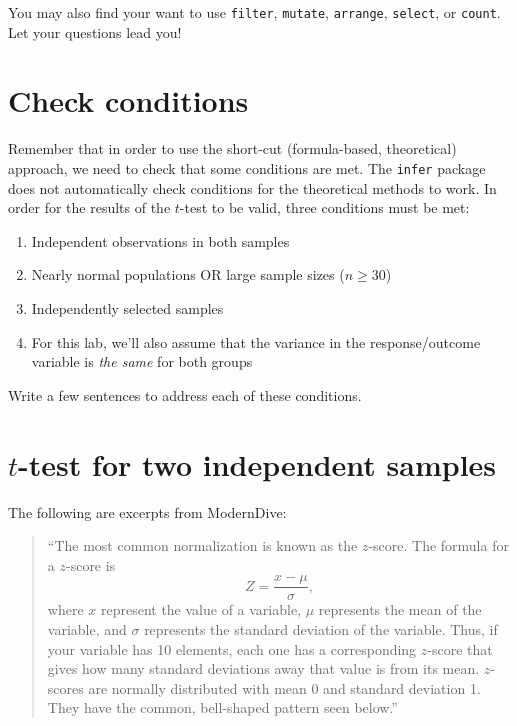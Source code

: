 \documentclass[]{article}
\providecommand{\tightlist}{%
  \setlength{\itemsep}{0pt}\setlength{\parskip}{0pt}}
\begin{document}
You may also find your want to use \texttt{filter}, \texttt{mutate},
\texttt{arrange}, \texttt{select}, or \texttt{count}. Let your questions
lead you!

\section{Check conditions}\label{check-conditions}

Remember that in order to use the short-cut (formula-based, theoretical)
approach, we need to check that some conditions are met. The
\texttt{infer} package does not automatically check conditions for the
theoretical methods to work. In order for the results of the \(t\)-test
to be valid, three conditions must be met:

\begin{enumerate}
\def\labelenumi{\arabic{enumi}.}
\tightlist
\item
  Independent observations in both samples
\item
  Nearly normal populations OR large sample sizes (\(n \ge 30\))
\item
  Independently selected samples
\item
  For this lab, we'll also assume that the variance in the
  response/outcome variable is \emph{the same} for both groups
\end{enumerate}

Write a few sentences to address each of these conditions.

\section{\texorpdfstring{\(t\)-test for two independent
samples}{t-test for two independent samples}}\label{t-test-for-two-independent-samples}

The following are excerpts from ModernDive:

\begin{quote}
``The most common normalization is known as the \(z\)-score. The formula
for a \(z\)-score is \[Z = \frac{x - \mu}{\sigma},\] where \(x\)
represent the value of a variable, \(\mu\) represents the mean of the
variable, and \(\sigma\) represents the standard deviation of the
variable. Thus, if your variable has 10 elements, each one has a
corresponding \(z\)-score that gives how many standard deviations away
that value is from its mean. \(z\)-scores are normally distributed with
mean 0 and standard deviation 1. They have the common, bell-shaped
pattern seen below.''
\end{quote}
\end{document}
